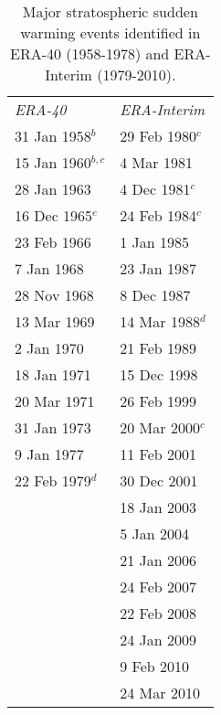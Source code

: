\documentclass[draft,jgrga]{agutex}
\begin{document}
\begin{table}
\caption{Major stratospheric sudden warming events identified in ERA-40 (1958-1978) and ERA-Interim (1979-2010).}\centering
\begin{tabular}{l|l}
 \hline
\textit{ERA-40}			& \textit{ERA-Interim}		\\
31 Jan 1958$^b$		&	29 Feb 1980$^{c}$		\\
15 Jan 1960$^{b,c}$	&	4 Mar 1981			\\
28 Jan 1963		&		4 Dec 1981$^{c}$		\\
16 Dec 1965$^{e}$	&		24 Feb 1984$^{c}$		\\
23 Feb 1966		&		1 Jan 1985			\\
7 Jan 1968		&		23 Jan 1987		\\
28 Nov 1968		&		8 Dec 1987			\\
13 Mar 1969 		&		14 Mar 1988$^d$			\\
2 Jan 1970		&		21 Feb 1989			\\
18 Jan 1971		&		15 Dec 1998			\\
20 Mar 1971 		&		26 Feb 1999			\\
31 Jan 1973		&		20 Mar 2000$^{c}$		\\
9 Jan 1977		&		11 Feb 2001			\\
22 Feb 1979$^{d}$	&		30 Dec 2001			\\

					&	18 Jan 2003	 	\\
			&	5  Jan 2004	 		\\
			&	21 Jan 2006	 		\\
			&	24 Feb 2007	 		\\
			&	22 Feb 2008	 		\\
 			&	24 Jan 2009			\\
 			&	9 Feb 2010	 			\\
			&	24 Mar 2010			\\
 \hline
\end{tabular}
\label{tab:warmings}
\end{table}
\end{document}
